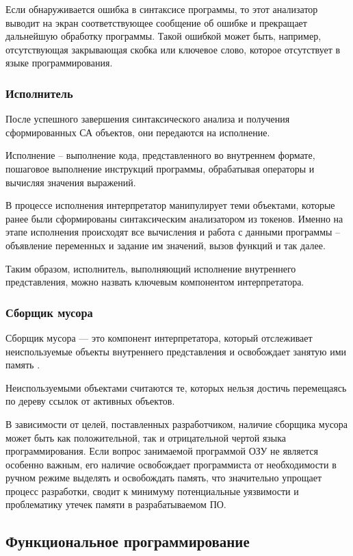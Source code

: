 Если обнаруживается ошибка в синтаксисе программы, то этот анализатор выводит на экран соответствующее сообщение об ошибке и прекращает дальнейшую обработку программы. Такой ошибкой может быть, например, отсутствующая закрывающая скобка или ключевое слово, которое отсутствует в языке программирования.



\subsubsection{Исполнитель}

После успешного завершения синтаксического анализа и получения сформированных СА объектов, они передаются на исполнение.

Исполнение -- выполнение кода, представленного во внутреннем формате, пошаговое выполнение инструкций программы, обрабатывая операторы и вычисляя значения выражений.

В процессе исполнения интерпретатор манипулирует теми объектами, которые ранее были сформированы синтаксическим анализатором из токенов. Именно на этапе исполнения происходят все вычисления и работа с данными программы -- объявление переменных и задание им значений, вызов функций и так далее.

Таким образом, исполнитель, выполняющий исполнение внутреннего представления, можно назвать ключевым компонентом интерпретатора.


\subsubsection{Сборщик мусора}
Сборщик мусора — это компонент интерпретатора, который отслеживает неиспользуемые объекты внутреннего представления и освобождает занятую ими память \cite{e17}.

Неиспользуемыми объектами считаются те, которых нельзя достичь перемещаясь по дереву ссылок от активных объектов.

В зависимости от целей, поставленных разработчиком, наличие сборщика мусора может быть как положительной, так и отрицательной чертой языка программирования. Если вопрос занимаемой программой ОЗУ не является особенно важным, его наличие освобождает программиста от необходимости в ручном режиме выделять и освобождать память, что значительно упрощает процесс разработки, сводит к минимуму потенциальные уязвимости и проблематику утечек памяти в разрабатываемом ПО.


\subsection{Функциональное программирование}


